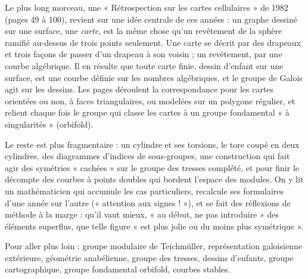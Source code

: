 \documentclass[11pt,a4paper]{article}
\begin{document}
\begin{resume}
Le plus long morceau, une « Rétrospection sur les cartes cellulaires » de
1982 (pages 49 à 100), revient sur une idée centrale de ces années : un
graphe dessiné sur une surface, une \emph{carte}, est la même chose qu'un
revêtement de la sphère ramifié au-dessus de trois points seulement. Une
carte se décrit par des drapeaux et trois façons de passer d'un drapeau à son
voisin ; un revêtement, par une courbe algébrique. Il en résulte que
toute carte finie, dessin d'enfant sur une surface, est une courbe définie sur
les nombres algébriques, et le groupe de Galois agit sur les dessins. Les
pages déroulent la correspondance pour les cartes orientées ou non, à faces
triangulaires, ou modelées sur un polygone régulier, et relient chaque fois le
groupe qui classe les cartes à un groupe fondamental « à singularités »
(orbifold).

Le reste est plus fragmentaire : un cylindre et ses torsions, le tore coupé
en deux cylindres, des diagrammes d'indices de sous-groupes, une construction
qui fait agir des symétries « cachées » sur le groupe des tresses complété, et
pour finir le décompte des courbes à points doubles qui bordent l'espace des
modules. On y lit un mathématicien qui accumule les cas particuliers,
recalcule ses formulaires d'une année sur l'autre (« attention aux
signes ! »), et se fait des réflexions de méthode à la marge : qu'il vaut
mieux, « au début, ne pas introduire » des éléments superflus, que telle
figure « est plus jolie ou du moins plus symétrique ».

Pour aller plus loin : groupe modulaire de Teichmüller, représentation
galoisienne extérieure, géométrie anabélienne, groupe des tresses, dessins
d'enfants, groupe cartographique, groupe fondamental orbifold, courbes
stables.

\end{resume}
\end{document}
